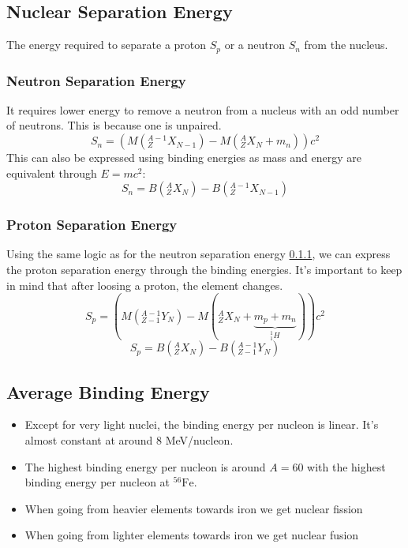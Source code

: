 \subsection{Nuclear Separation Energy}
The energy required to separate a proton $S_{p}$ or a neutron $S_{n}$ from the nucleus.
\subsubsection{Neutron Separation Energy}\label{sssec: neutron_separation_energy}
It requires lower energy to remove a neutron from a nucleus with an odd number of neutrons. This is because one is unpaired. 
\begin{equation}
S_n = \left(M\left(_{Z}^{A-1}X_{N-1}\right) - M(_{Z}^{A}X_{N} + m_n)\right)c^2
\end{equation}
This can also be expressed using binding energies as mass and energy are equivalent through $E = mc^2$:
\begin{equation}
S_n = B\left(_{Z}^{A}X_{N}\right) - B\left(_{Z}^{A-1}X_{N-1}\right)
\end{equation}

\subsubsection{Proton Separation Energy}
Using the same logic as for the neutron separation energy \cref{sssec: neutron_separation_energy}, we can express the proton separation energy through the binding energies. It's important to keep in mind that after loosing a proton, the element changes.
\begin{equation}
S_p= \left(M\left(_{Z-1}^{A-1}Y_{N}\right) - M(_{Z}^{A}X_{N} + \underbrace{m_p + m_n}_{_{1}^{1}H_{}})\right)c^2
\end{equation}
\begin{equation}
S_p = B\left(_{Z}^{A}X_{N}\right) - B\left(_{Z-1}^{A-1}Y_{N}\right)
\end{equation}

\subsection{Average Binding Energy}
\begin{itemize}
    \item Except for very light nuclei, the binding energy per nucleon is linear. It's almost constant at around 8 MeV/nucleon.
    \item The highest binding energy per nucleon is around $A = 60$ with the highest binding energy per nucleon at $^{56}\text{Fe}$. 
    \item When going from heavier elements towards iron we get nuclear fission
    \item When going from lighter elements towards iron we get nuclear fusion
\end{itemize}

